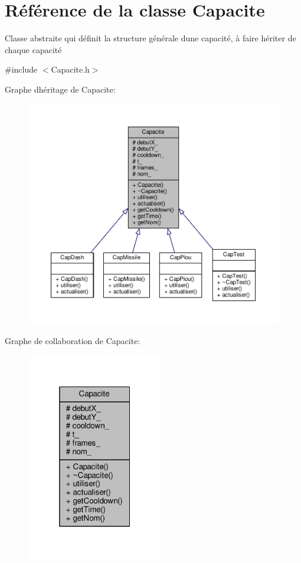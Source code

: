 \hypertarget{class_capacite}{}\section{Référence de la classe Capacite}
\label{class_capacite}


Classe abstraite qui définit la structure générale d\textquotesingle{}une capacité, à faire hériter de chaque capacité  




{\ttfamily \#include $<$Capacite.\+h$>$}



Graphe d\textquotesingle{}héritage de Capacite\+:\nopagebreak
\begin{figure}[H]
\begin{center}
\leavevmode
\includegraphics[width=350pt]{class_capacite__inherit__graph}
\end{center}
\end{figure}


Graphe de collaboration de Capacite\+:\nopagebreak
\begin{figure}[H]
\begin{center}
\leavevmode
\includegraphics[width=169pt]{class_capacite__coll__graph}
\end{center}
\end{figure}
